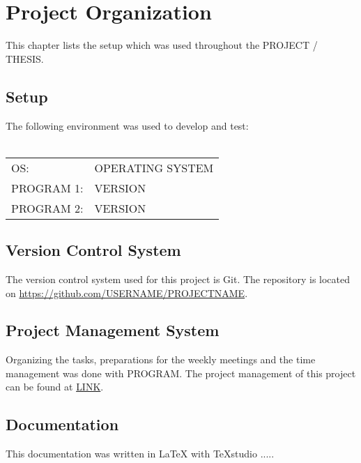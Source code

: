 \chapter{Project Organization}
\label{ch:project_organization}
This chapter lists the setup which was used throughout the PROJECT / THESIS.

\section{Setup}
\label{sec:setup}
The following environment was used to develop and test: \\ \\
\noindent \begin{tabular}{| l p{13cm} }
	OS: & OPERATING SYSTEM   \\
	PROGRAM 1: & VERSION \\
	PROGRAM 2: & VERSION
\end{tabular}

\section{Version Control System}
The version control system used for this project is Git. The repository is located on \url{https://github.com/USERNAME/PROJECTNAME}.

\section{Project Management System}
Organizing the tasks, preparations for the weekly meetings and the time management was done with PROGRAM. The project management of this project can be found at \url{LINK}.

\section{Documentation}
This documentation was written in LaTeX with TeXstudio \cite{texstudio}.....